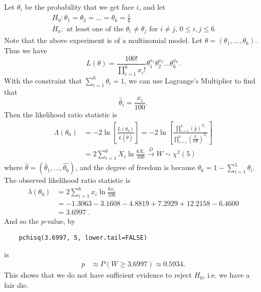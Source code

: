 \documentclass[notoc,notitlepage]{tufte-book}
\newcommand{\convd}{\overset{D}{\to}}
\begin{document}
\begin{solution}
  Let $\theta_i$ be the probability that we get face $i$, and let
  \begin{gather*}
    H_0 : \theta_1 = \theta_2 = \hdots = \theta_6 = \frac{1}{6} \\
    H_a : \text{ at least one of the } \theta_i \neq \theta_j \text{ for } i \neq j, \, 0 \leq i, j \leq 6
  \end{gather*}
  Note that the above experiment is of a multinomial model. Let $\theta = (\theta_1, ..., \theta_6)$. Thus we have
  \begin{equation*}
    L(\theta) = \frac{100!}{\prod_{i=1}^{6} x_i!} \theta_1^{x_1} \theta_2^{x_2} \hdots \theta_6^{x_6}.
  \end{equation*}
  With the constraint that $\sum_{i=1}^{6} \theta_i = 1$, we can use Lagrange's Multiplier to find that
  \begin{equation*}
    \hat{\theta}_i = \frac{x_i}{100}.
  \end{equation*}
  Then the likelihood ratio statistic is
  \begin{align*}
    \Lambda(\theta_0) &= -2 \ln \left[ \frac{L(\theta_0)}{L(\hat{\theta})} \right] = -2 \ln \left[ \frac{ \prod_{i=1}^{6} (\frac{1}{6})^{ X_i }}{\prod_{i=1}^{6} (\frac{X_i}{100})^{X_i}} \right] \\
                      &= 2 \sum_{i=1}^{6} X_i \ln \frac{6 X_i}{100} \convd W \sim \chi^2(5)
  \end{align*}
  where $\hat{\theta} = (\hat{\theta}_1, ..., \hat{\theta_6})$, and the degree of freedom is because $\theta_6 = 1 - \sum_{i=1}^{5} \theta_i$. The observed likelihood ratio statistic is
  \begin{align*}
    \lambda(\theta_0) &= 2 \sum_{i=1}^{6} x_i \ln \frac{6x_i}{100} \\
      &= -1.3063 - 3.1608 - 4.8819 + 7.2929 + 12.2158 - 6.4600 \\
      &= 3.6997 \; .
  \end{align*}
  And so the $p$-value, by
  \begin{lstlisting}
    pchisq(3.6997, 5, lower.tail=FALSE)
  \end{lstlisting}
  is
  \begin{align*}
    p &\approx P(W \geq 3.6997) \approx 0.5934.
  \end{align*}
  This shows that we do not have sufficient evidence to reject $H_0$, i.e. we have a fair die.
\end{solution}
\end{document}

